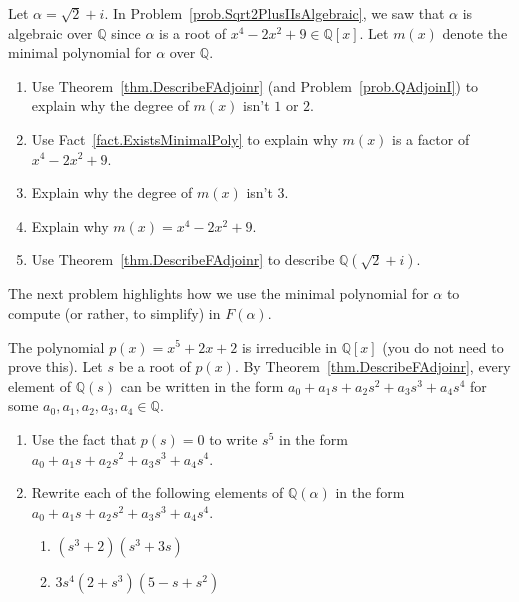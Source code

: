 \begin{problem}\label{prob.DescribeQAdjoinSqrt2PlusI}
Let $\alpha = \sqrt{2} + i$. In Problem~\ref{prob.Sqrt2PlusIIsAlgebraic}, we saw that $\alpha$ is algebraic over $\mathbb{Q}$ since $\alpha$ is a root of  $x^4-2x^2+9\in \mathbb{Q}[x]$. Let $m(x)$ denote the minimal polynomial for $\alpha$ over $\mathbb{Q}$.
\begin{enumerate}
\item Use Theorem~\ref{thm.DescribeFAdjoinr} (and Problem~\ref{prob.QAdjoinI}) to explain why the degree of $m(x)$ isn't $1$ or $2$.
\item Use Fact~\ref{fact.ExistsMinimalPoly} to explain why $m(x)$ is a factor of $x^4-2x^2+9$.
\item Explain why the degree of $m(x)$ isn't $3$.
\item Explain why  $m(x)=x^4-2x^2+9$.
\item Use Theorem~\ref{thm.DescribeFAdjoinr} to describe $\mathbb{Q}(\sqrt{2} + i)$.
\end{enumerate}
\end{problem}

The next problem highlights how we use the minimal polynomial for $\alpha$ to compute (or rather, to simplify) in  $F(\alpha)$.

\begin{problem}
The polynomial $p(x) = x^5 + 2x + 2$ is irreducible in $\mathbb{Q}[x]$ (you do not need to prove this). Let $s$ be a root of $p(x)$. By Theorem~\ref{thm.DescribeFAdjoinr}, every element of $\mathbb{Q}(s)$ can be written in the form $a_0 + a_1s + a_2s^2 + a_3s^3 + a_4s^4$ for some $a_0,a_1,a_2,a_3,a_4 \in \mathbb{Q}$.
\begin{enumerate}
\item Use the fact that $p(s) = 0$ to write $s^5$ in the form  $a_0 + a_1s + a_2s^2 + a_3s^3 + a_4s^4$.
\item Rewrite each of the following elements of $\mathbb{Q}(\alpha)$ in the form  $a_0 + a_1s + a_2s^2 + a_3s^3 + a_4s^4$.
\begin{enumerate}
\item $(s^3+2)(s^3+3s)$
\item $3s^4(2+s^3)(5-s+s^2)$
\end{enumerate}
\end{enumerate}
\end{problem}


